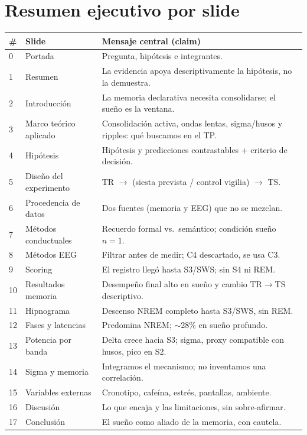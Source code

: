 \documentclass[11pt,a4paper]{article}
\begin{document}
\section{Resumen ejecutivo por slide}
\renewcommand{\arraystretch}{1.25}
\begin{longtable}{@{}p{0.7cm}p{6.1cm}p{8.5cm}@{}}
\toprule
\textbf{\#} & \textbf{Slide} & \textbf{Mensaje central (claim)} \\
\midrule
0 & Portada & Pregunta, hipótesis e integrantes. \\
1 & Resumen & La evidencia apoya descriptivamente la hipótesis, no la demuestra. \\
2 & Introducción & La memoria declarativa necesita consolidarse; el sueño es la ventana. \\
3 & Marco teórico aplicado & Consolidación activa, ondas lentas, sigma/husos y ripples: qué buscamos en el TP. \\
4 & Hipótesis & Hipótesis y predicciones contrastables + criterio de decisión. \\
5 & Diseño del experimento & TR $\to$ (siesta prevista / control vigilia) $\to$ TS. \\
6 & Procedencia de datos & Dos fuentes (memoria y EEG) que no se mezclan. \\
7 & Métodos conductuales & Recuerdo formal vs.\ semántico; condición sueño $n=1$. \\
8 & Métodos EEG & Filtrar antes de medir; C4 descartado, se usa C3. \\
9 & Scoring & El registro llegó hasta S3/SWS; sin S4 ni REM. \\
10 & Resultados memoria & Desempeño final alto en sueño y cambio TR$\to$TS descriptivo. \\
11 & Hipnograma & Descenso NREM completo hasta S3/SWS, sin REM. \\
12 & Fases y latencias & Predomina NREM; $\sim$28\% en sueño profundo. \\
13 & Potencia por banda & Delta crece hacia S3; sigma, proxy compatible con husos, pico en S2. \\
14 & Sigma y memoria & Integramos el mecanismo; no inventamos una correlación. \\
15 & Variables externas & Cronotipo, cafeína, estrés, pantallas, ambiente. \\
16 & Discusión & Lo que encaja y las limitaciones, sin sobre-afirmar. \\
17 & Conclusión & El sueño como aliado de la memoria, con cautela. \\
\bottomrule
\end{longtable}
\end{document}
